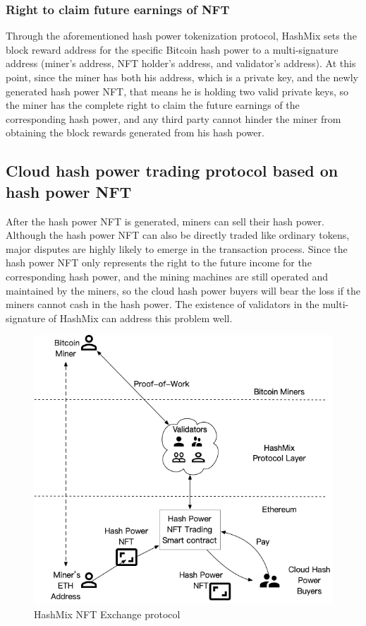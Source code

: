 \documentclass[]{template/llncs}
\begin{document}
\subsubsection{Right to claim future earnings of NFT}

Through the aforementioned hash power tokenization protocol, HashMix sets the block reward address for the specific Bitcoin hash power to a multi-signature address (miner’s address, NFT holder’s address, and validator’s address). At this point, since the miner has both his address, which is a private key, and the newly generated hash power NFT, that means he is holding two valid private keys, so the miner has the complete right to claim the future earnings of the corresponding hash power, and any third party cannot hinder the miner from obtaining the block rewards generated from his hash power.

\subsection{Cloud hash power trading protocol based on hash power NFT}

After the hash power NFT is generated, miners can sell their hash power. Although the hash power NFT can also be directly traded like ordinary tokens, major disputes are highly likely to emerge in the transaction process. Since the hash power NFT only represents the right to the future income for the corresponding hash power, and the mining machines are still operated and maintained by the miners, so the cloud hash power buyers will bear the loss if the miners cannot cash in the hash power. The existence of validators in the multi-signature of HashMix can address this problem well.

\begin{figure}[htbp]
\centering
\includegraphics[width=0.9\columnwidth]{figure/nft-exchange-new-en}
\caption{HashMix NFT Exchange protocol}
\label{fig:exchange}
\end{figure}
\end{document}
